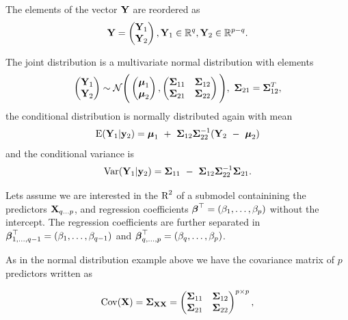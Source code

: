 \documentclass[11pt,a4paper,twoside]{book}\usepackage[]{graphicx}\usepackage[]{color}
\begin{document}
The elements of the vector ${\mathbf{Y}}$ are reordered as
\begin{align*}
\mathbf{Y} = \begin{pmatrix}
\mathbf{Y}_{1} \\ 
\mathbf{Y}_{2} \end{pmatrix}, \mathbf{Y}_{1} \in {\mathbb{R}}^q, \mathbf{Y}_{2} \in {\mathbb{R}}^{p-q} .
\end{align*}

The joint distribution is a multivariate normal distribution with elements
\begin{align*}
\begin{pmatrix}
\mathbf{Y}_{1} \\ 
\mathbf{Y}_{2} \end{pmatrix} \sim \mathcal{N}
\Bigg(\begin{pmatrix}
\boldsymbol{\mu}_{1} \\ 
\boldsymbol{\mu}_{2} 
\end{pmatrix},
\begin{pmatrix}
{\boldsymbol{\Sigma}}{}_{11} & {\boldsymbol{\Sigma}}{}_{12} \\
{\boldsymbol{\Sigma}}{}_{21} & {\boldsymbol{\Sigma}}{}_{22} \\
\end{pmatrix}\Bigg),
\ {\boldsymbol{\Sigma}}{}_{21} = {\boldsymbol{\Sigma}}{}_{12}^{T},
\end{align*}
the conditional distribution is normally distributed again with mean 
\begin{align*}
\E (\mathbf{Y}_{1} | \mathbf{y}_{2} ) = \boldsymbol{\mu}_{1}\ +\ \bSigma_{12} \bSigma_{22}^{-1}(\mathbf{Y}_{2}\ -\ \boldsymbol{\mu}_{2})
\end{align*}
and the conditional variance is
\begin{align}
\operatorname{Var} ( \mathbf{Y}_{1} | \mathbf{y}_{2} ) = {\boldsymbol{\Sigma}}{}_{11}\ -\ {\boldsymbol{\Sigma}}{}_{12} {\boldsymbol{\Sigma}}{}_{22}^{-1}{\boldsymbol{\Sigma}}{}_{21} \text{.} \label{eq:condvar} 
\end{align}

Lets assume we are interested in the $\text{R}^2$ of a submodel containining the predictors ${\mathbf{X}}_{q...p}$, and regression coefficients ${\boldsymbol{\beta}}^\top = (\beta_{1}, \dotsc, \beta_{p})$ without the intercept. The regression coefficients are further separated in ${\boldsymbol{\beta}}^\top_{1  ,\dotsc,  q-1} = (\beta_{1} ,\dotsc, \beta_{q-1})$ and ${\boldsymbol{\beta}}^\top_{q ,\dotsc, p} = (\beta_{q} ,\dotsc, \beta_{p})$. 

As in the normal distribution example above we have the covariance matrix of $p$ predictors written as 

      \begin{align*} 
\operatorname{Cov}({\mathbf{X}}) =	{\boldsymbol{\Sigma}}{}_{{\mathbf{X}} {\mathbf{X}}} = \begin{pmatrix}
{\boldsymbol{\Sigma}}{}_{11} & {\boldsymbol{\Sigma}}{}_{12} \\
{\boldsymbol{\Sigma}}{}_{21} & {\boldsymbol{\Sigma}}{}_{22}  \\
\end{pmatrix}^{p \times p}, 
   \end{align*}
   
\end{document}
